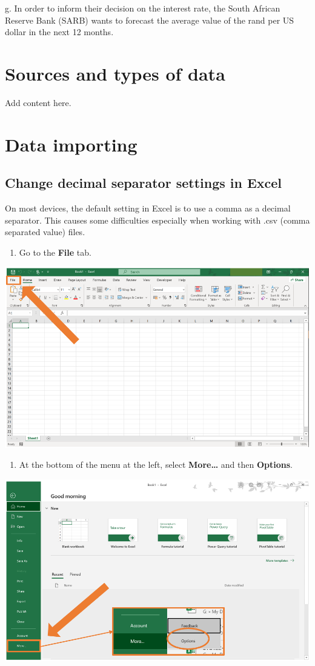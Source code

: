\documentclass[
]{book}
\providecommand{\tightlist}{%
  \setlength{\itemsep}{0pt}\setlength{\parskip}{0pt}}
\begin{document}
g. In order to inform their decision on the interest rate, the South African Reserve Bank (SARB) wants to forecast the average value of the rand per US dollar in the next 12 months.

\chapter{Sources and types of data}\label{sec1-8}

Add content here.

\chapter{Data importing}\label{ch2}

\section{Change decimal separator settings in Excel}\label{change-decimal-separator-settings-in-excel}

On most devices, the default setting in Excel is to use a comma as a decimal separator. This causes some difficulties especially when working with .csv (comma separated value) files.

\begin{enumerate}
\def\labelenumi{\arabic{enumi}.}
\tightlist
\item
  Go to the \textbf{File} tab.
\end{enumerate}

\begin{center}\includegraphics[width=0.5\linewidth]{Figures/decimal_step1} \end{center}

\begin{enumerate}
\def\labelenumi{\arabic{enumi}.}
\setcounter{enumi}{1}
\tightlist
\item
  At the bottom of the menu at the left, select \textbf{More\ldots{}} and then \textbf{Options}.
\end{enumerate}

\begin{center}\includegraphics[width=0.5\linewidth]{Figures/Decimal_step2} \end{center}
\end{document}
